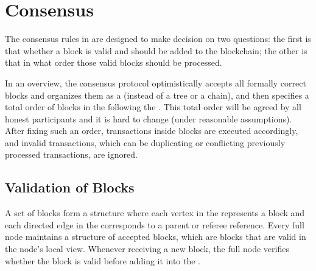 

\section{Consensus}

The consensus rules in {\name} are designed to make decision on two questions: the first is that whether a block is valid and should be added to the {\name} blockchain; the other is that in what order those valid blocks should be processed.   

In an overview, the \name consensus protocol optimistically accepts all formally correct blocks and organizes them as a \tg (instead of a tree or a chain), and then specifies a total order of blocks in the \tg following the  .
This total order will be agreed by all honest participants and it is hard to change (under reasonable assumptions). 
After fixing such an order, transactions inside blocks are executed accordingly, and invalid transactions, which can be duplicating or conflicting previously processed transactions, are ignored.



\subsection{Validation of Blocks}
\label{sec:block validate}

A set of {\name} blocks form a \tg structure where each vertex in the \tg represents a {\name} block and each directed edge in the \tg corresponds to a parent or referee reference. 
Every full node maintains a \tg structure of accepted blocks, which are blocks that are valid in the node's local view.
Whenever receiving a new block, the full node verifies whether the block is valid before adding it into the \tg.

